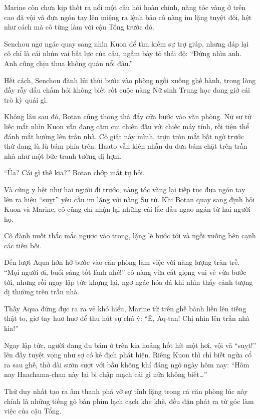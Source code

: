\documentclass[../main.tex]{subfiles}
\begin{document}

Marine còn chưa kịp thốt ra nổi một câu hỏi hoàn chỉnh, nàng tóc vàng ở trên cao đã vội vã đưa ngón tay lên miệng ra lệnh bảo cô nàng im lặng tuyệt đối, hệt như cách mà cô từng làm với cậu Tổng trước đó.

Senchou ngơ ngác quay sang nhìn Kuon để tìm kiếm sự trợ giúp, nhưng đáp lại cô chỉ là cái nhún vai bất lực của cậu, ngầm bày tỏ thái độ: ``Đừng nhìn anh. Anh cũng chịu thua không quản nổi đâu.''

Hết cách, Senchou đành lủi thủi bước vào phòng ngồi xuống ghế bành, trong lòng đầy rẫy dấu chấm hỏi không biết rốt cuộc nàng Nữ sinh Trung học đang giở cái trò kỳ quái gì.

\ct

Không lâu sau đó, Botan cũng thong thả đẩy cửa bước vào văn phòng. Nữ sư tử liếc mắt nhìn Kuon vẫn đang cặm cụi chiến đấu với chiếc máy tính, rồi tiện thể đánh mắt hướng lên trần nhà. Cô giật nảy mình, trợn tròn mắt bất ngờ trước thứ đang lù lù bám phía trên: Haato vẫn kiên nhẫn đu đưa bám chặt trên trần nhà như một bức tranh tường dị hợm.

``Ủa? Cái gì thế kia?'' Botan chớp mắt tự hỏi.

Và cũng y hệt như hai người đi trước, nàng tóc vàng lại tiếp tục đưa ngón tay lên ra hiệu ``suỵt'' yêu cầu im lặng với nàng Sư tử. Khi Botan quay sang định hỏi Kuon và Marine, cô cũng chỉ nhận lại những cái lắc đầu ngao ngán từ hai người họ.

Cô đành nuốt thắc mắc ngược vào trong, lặng lẽ bước tới và ngồi xuống bên cạnh các tiền bối.

\ct

Đến lượt Aqua hớn hở bước vào căn phòng làm việc với năng lượng tràn trề. ``Mọi người ơi, buổi sáng tốt lành nhé!'' cô nàng vừa cất giọng vui vẻ vừa bước tới, nhưng rồi ngay lập tức khựng lại, ngơ ngác hóa đá khi nhìn thấy cảnh tượng dị thường trên trần nhà.

Thấy Aqua đứng đực ra ra vẻ khó hiểu, Marine từ trên ghế bành liền lên tiếng thật to, giơ tay huơ huơ để thu hút sự chú ý: ``Ê, Aq-tan! Chị nhìn lên trần nhà kìa!''

Ngay lập tức, người đang đu bám ở trên kia hoảng hốt hít một hơi, vội vã ``suỵt!'' lên đầy tuyệt vọng như sợ có kẻ địch phát hiện. Riêng Kuon thì chỉ biết ngửa cổ ra sau ghế, thở dài sườn sượt với bầu không khí đáng ngờ ngày hôm nay: ``Hôm nay Haachama-chan này lại bị chập mạch cái gì nữa không biết\dots''

Thứ duy nhất tạo ra âm thanh phá vỡ sự tĩnh lặng trong cả căn phòng lúc này chính là những tiếng gõ bàn phím lạch cạch khe khẽ, đều đặn phát ra từ góc làm việc của cậu Tổng.
\end{document}
